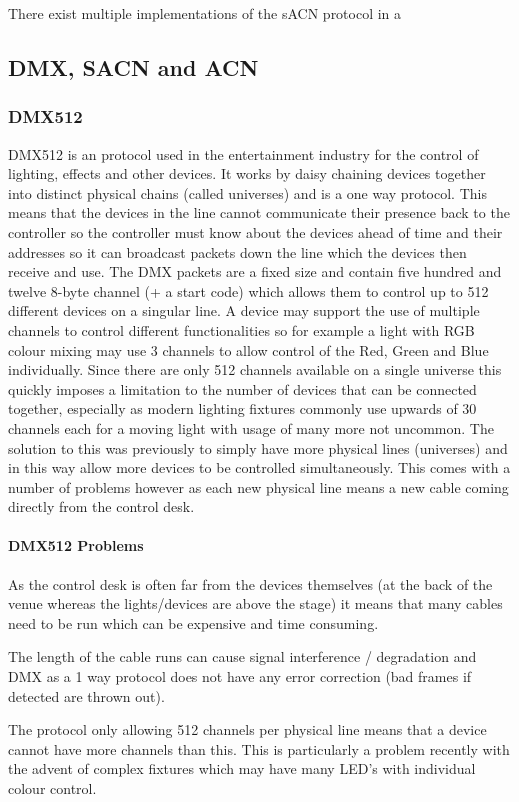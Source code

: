 \documentclass[11pt,a4paper,notitlepage]{report}
\begin{document}
	There exist multiple implementations of the sACN protocol in a 
	
	
	\subsection{DMX, SACN and ACN}
	\subsubsection*{DMX512} DMX512 is an protocol used in the entertainment industry for the control of lighting, effects and other devices. It works by daisy chaining devices together into distinct physical chains (called universes) and is a one way protocol. This means that the devices in the line cannot communicate their presence back to the controller so the controller must know about the devices ahead of time and their addresses so it can broadcast packets down the line which the devices then receive and use. The DMX packets are a fixed size and contain five hundred and twelve 8-byte channel (+ a start code) which allows them to control up to 512 different devices on a singular line. A device may support the use of multiple channels to control different functionalities so for example a light with RGB colour mixing may use 3 channels to allow control of the Red, Green and Blue individually. Since there are only 512 channels available on a single universe this quickly imposes a limitation to the number of devices that can be connected together, especially as modern lighting fixtures commonly use upwards of 30 channels each for a moving light with usage of many more not uncommon. The solution to this was previously to simply have more physical lines (universes) and in this way allow more devices to be controlled simultaneously. This comes with a number of problems however as each new physical line means a new cable coming directly from the control desk.
	
	\paragraph*{DMX512 Problems}
	\begin{list}{}{}
		\item As the control desk is often far from the devices themselves (at the back of the venue whereas the lights/devices are above the stage) it means that many cables need to be run which can be expensive and time consuming.
		\item The length of the cable runs can cause signal interference / degradation and DMX as a 1 way protocol does not have any error correction (bad frames if detected are thrown out).
		\item The protocol only allowing 512 channels per physical line means that a device cannot have more channels than this. This is particularly a problem recently with the advent of complex fixtures which may have many LED's with individual colour control.
	\end{list}
	
\end{document}
